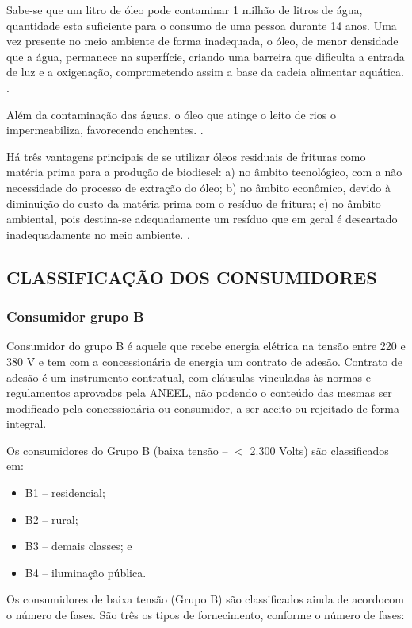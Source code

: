    Sabe-se que um litro de óleo pode contaminar 1 milhão de litros de água, quantidade esta suficiente para o consumo de uma pessoa durante 14 anos. Uma vez presente no meio ambiente de forma inadequada, o óleo, de menor densidade que a água,  permanece  na  superfície, criando uma barreira que dificulta a entrada de luz e a oxigenação, comprometendo assim a base da cadeia alimentar aquática. \cite{bilck}.
    
    Além da contaminação das águas, o óleo que atinge o leito de rios o impermeabiliza, favorecendo enchentes. \cite{felizardo}.

    Há três vantagens principais de se utilizar óleos residuais de frituras como matéria prima para a produção de biodiesel: a) no âmbito tecnológico, com a não necessidade do processo de extração do óleo; b) no âmbito econômico, devido à diminuição do custo da matéria prima com o resíduo de fritura; c) no âmbito ambiental, pois destina-se adequadamente um resíduo que em geral é descartado inadequadamente no meio ambiente. \cite{bumba}.

\subsection{CLASSIFICAÇÃO DOS CONSUMIDORES}

\subsubsection{Consumidor grupo B}

Consumidor do grupo B é aquele que recebe energia elétrica na tensão entre 220 e 380 V e tem com a concessionária de energia um contrato de adesão. Contrato de adesão é um instrumento contratual, com cláusulas vinculadas às normas e regulamentos aprovados pela ANEEL, não podendo o conteúdo das mesmas ser modificado pela concessionária ou consumidor, a ser aceito ou rejeitado de forma integral.

Os consumidores do Grupo B (baixa tensão -- $<$ 2.300 Volts) são classificados em:

\begin{itemize}
    \item B1 -- residencial;
    \item B2 -- rural;
    \item B3 -- demais classes; e
    \item B4 -- iluminação pública.
\end{itemize}

Os consumidores de baixa tensão (Grupo B) são classificados ainda de acordocom o número de fases. São três os tipos de fornecimento, conforme o número de fases:

